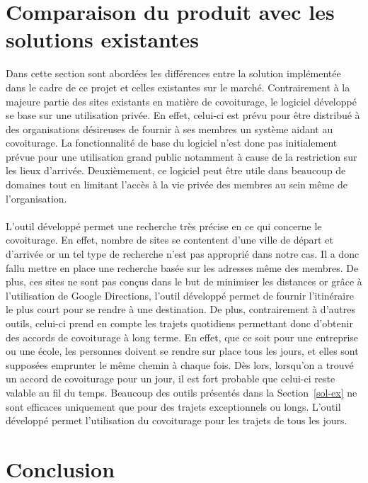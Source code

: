 \documentclass[12pt, a4paper, oneside]{article}
\begin{document}
{{\section{Comparaison du produit avec les solutions existantes}\label{comp}
    Dans cette section sont abordées les différences entre la solution implémentée dans le cadre de ce projet et celles existantes sur le marché. Contrairement à la majeure partie des sites existants en matière de covoiturage, le logiciel développé se base sur une utilisation privée. En effet, celui-ci est prévu pour être distribué à des organisations désireuses de fournir à ses membres un système aidant au covoiturage. La fonctionnalité de base du logiciel n'est donc pas initialement prévue pour une utilisation grand public notamment à cause de la restriction sur les lieux d'arrivée. Deuxièmement, ce logiciel peut être utile dans beaucoup de domaines tout en limitant l'accès à la vie privée des membres au sein même de l'organisation.\\\\
    \indent L'outil développé permet une recherche très précise en ce qui concerne le covoiturage. En effet, nombre de sites se contentent d'une ville de départ et d'arrivée or un tel type de recherche n'est pas approprié dans notre cas. Il a donc fallu mettre en place une recherche basée sur les adresses même des membres. De plus, ces sites ne sont pas conçus dans le but de minimiser les distances or grâce à l'utilisation de Google Directions, l'outil développé permet de fournir l'itinéraire le plus court pour se rendre à une destination. De plus, contrairement à d'autres outils, celui-ci prend en compte les trajets quotidiens permettant donc d'obtenir des accords de covoiturage à long terme. En effet, que ce soit pour une entreprise ou une école, les personnes doivent se rendre sur place tous les jours, et elles sont supposées emprunter le même chemin à chaque fois. Dès lors, lorsqu'on a trouvé un accord de covoiturage pour un jour, il est fort probable que celui-ci reste valable au fil du temps. Beaucoup des outils présentés dans la Section~\ref{sol-ex} ne sont efficaces uniquement que pour des trajets exceptionnels ou longs. L'outil développé permet l'utilisation du covoiturage pour les trajets de tous les jours.
\section{Conclusion}
}}
\end{document}
